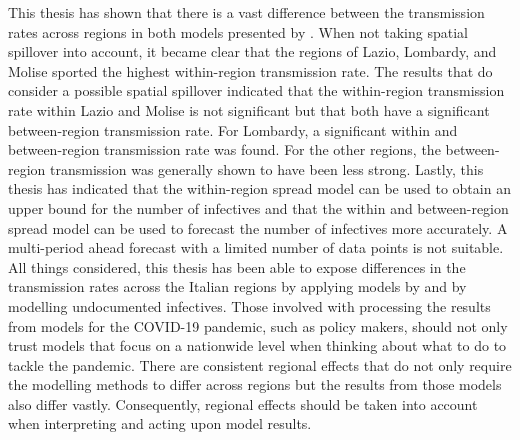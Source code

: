 \documentclass[12pt]{article}
\begin{document}
	This thesis has shown that there is a vast difference between the transmission rates across regions in both models presented by \textcite{adda2016economic}. When not taking spatial spillover into account, it became clear that the regions of Lazio, Lombardy, and Molise sported the highest within-region transmission rate. The results that do consider a possible spatial spillover indicated that the within-region transmission rate within Lazio and Molise is not significant but that both have a significant between-region transmission rate. For Lombardy, a significant within and between-region transmission rate was found. For the other regions, the between-region transmission was generally shown to have been less strong. Lastly, this thesis has indicated that the within-region spread model can be used to obtain an upper bound for the number of infectives and that the within and between-region spread model can be used to forecast the number of infectives more accurately. A multi-period ahead forecast with a limited number of data points is not suitable. \\
	
	All things considered, this thesis has been able to expose differences in the transmission rates across the Italian regions by applying models by \textcite{adda2016economic} and by modelling undocumented infectives. Those involved with processing the results from models for the COVID-19 pandemic, such as policy makers, should not only trust models that focus on a nationwide level when thinking about what to do to tackle the pandemic. There are consistent regional effects that do not only require the modelling methods to differ across regions but the results from those models also differ vastly. Consequently, regional effects should be taken into account when interpreting and acting upon model results.
	
	
\end{document}
